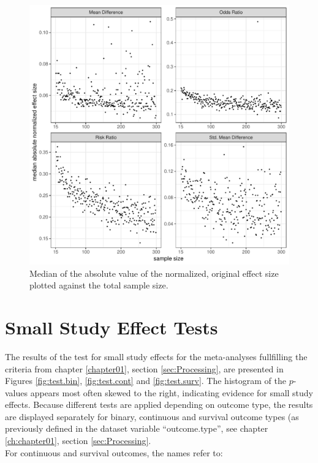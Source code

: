 \documentclass[11pt,a4paper,twoside]{book}\usepackage[]{graphicx}\usepackage[]{color}
\makeatletter
\def\maxwidth{ %
  \ifdim\Gin@nat@width>\linewidth
    \linewidth
  \else
    \Gin@nat@width
  \fi
}
\newenvironment{knitrout}{}{} %
\makeatother
\begin{document}
\begin{figure}
\begin{knitrout}
\color{fgcolor}
\includegraphics[width=\maxwidth]{figure/unnamed-chunk-11-1} 

\end{knitrout}
\caption{Median of the absolute value of the normalized, original effect size plotted against the total sample size.}
\label{effect.samplesize.separated}
\end{figure}




\section{Small Study Effect Tests}


The results of the test for small study effects for the meta-analyses fullfilling the criteria from chapter \ref{chapter01}, section \ref{sec:Processing}, are presented in Figures \ref{fig:test.bin}, \ref{fig:test.cont} and \ref{fig:test.surv}. The histogram of the $p$-values appears most often skewed to the right, indicating evidence for small study effects. Because different tests are applied depending on outcome type, the results are displayed separately for binary, continuous and survival outcome types (as previously defined in the dataset variable ``outcome.type'', see chapter \ref{ch:chapter01}, section \ref{sec:Processing}. \\
For continuous and survival outcomes, the names refer to: 
\end{document}
